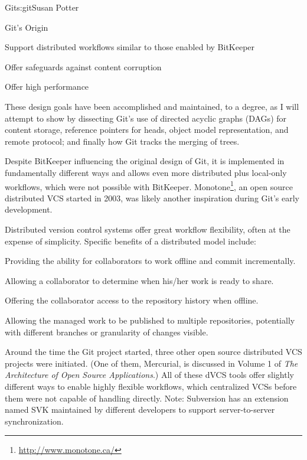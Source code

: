 \begin{aosachapter}{Git}{s:git}{Susan Potter}
\begin{aosasect1}{Git's Origin}
\begin{aosaitemize}
  \item Support distributed workflows similar to those enabled by BitKeeper
  \item Offer safeguards against content corruption
  \item Offer high performance
\end{aosaitemize}

These design goals have been accomplished and maintained, to a degree, as I
will attempt to show by dissecting Git's use of directed acyclic graphs
(DAGs) for content storage, reference pointers for heads, object model
representation, and remote protocol; and finally how Git tracks the merging of trees.

Despite BitKeeper influencing the original design of Git, it is implemented
in fundamentally different ways and allows even more distributed plus
local-only workflows, which were not possible with BitKeeper. 
Monotone\footnote{\url{http://www.monotone.ca/}},
an open source distributed VCS started in 2003, was likely another
inspiration during Git's early development.

Distributed version control systems offer great workflow flexibility, often
at the expense of simplicity. Specific benefits of a distributed
model include:
\begin{aosaitemize}
  \item Providing the ability for collaborators to work offline and
  commit incrementally.
  \item Allowing a collaborator to determine when his/her work is
  ready to share.
  \item Offering the collaborator access to the repository history when
  offline.
  \item Allowing the managed work to be published to multiple repositories,
  potentially with different branches or granularity of changes visible.
\end{aosaitemize}

Around the time the Git project started, three other open source
distributed VCS projects were initiated. (One of them, Mercurial, is 
discussed in Volume 1 of \emph{The Architecture of Open Source Applications}.) All of these dVCS tools
offer slightly different ways to enable highly flexible workflows, which
centralized VCSs before them were not capable of handling directly.
Note: Subversion has an extension named SVK maintained by different developers
to support server-to-server synchronization.


\end{aosasect1}
\end{aosachapter}
